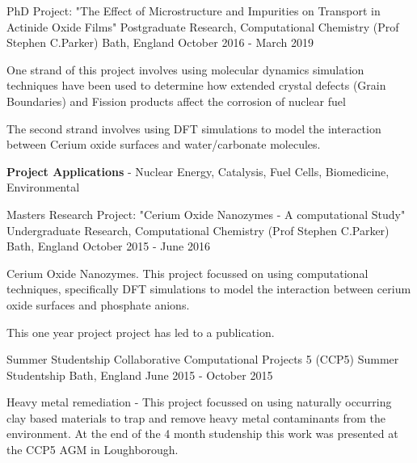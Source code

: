 \begin{cventries}
  \cventry
    {PhD Project: "The Effect of Microstructure and Impurities on Transport in Actinide Oxide Films"}
    {Postgraduate Research, Computational Chemistry (Prof Stephen C.Parker)}
    {Bath, England}
    {October 2016 - March 2019}
    {
      \begin{cvitems}
        \item {One strand of this project involves using molecular dynamics simulation techniques have been used to determine how extended crystal defects (Grain Boundaries) and Fission products affect the corrosion of nuclear fuel}
		\item{The second strand involves using DFT simulations to model the interaction between Cerium oxide surfaces and water/carbonate molecules.}
		\item{\textbf{Project Applications} - Nuclear Energy, Catalysis, Fuel Cells, Biomedicine, Environmental}
      \end{cvitems}
    }

  \cventry
    {Masters Research Project: "Cerium Oxide Nanozymes - A computational Study"}
    {Undergraduate Research, Computational Chemistry (Prof Stephen C.Parker)}
    {Bath, England}
    {October 2015 - June 2016}
    {
      \begin{cvitems}
        \item {Cerium Oxide Nanozymes. This project focussed on using computational techniques, specifically DFT simulations to model the interaction between cerium oxide surfaces and phosphate anions.} 
        \item{This one year project project has led to a publication.}
      \end{cvitems} 
    }
    
    \cventry
    {Summer Studentship}
    {Collaborative Computational Projects 5 (CCP5) Summer Studentship}
    {Bath, England}
    {June 2015 - October 2015}
    {
      \begin{cvitems}
        \item {Heavy metal remediation - This project focussed on using naturally occurring clay based materials to trap and remove heavy metal contaminants from the environment. At the end of the 4 month studenship this work was presented at the CCP5 AGM in Loughborough. }
      \end{cvitems}
    }
\end{cventries}
